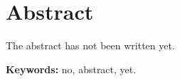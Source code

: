\chapter*{Abstract}

The abstract has not been written yet. %

\vspace{1em}

\noindent \textbf{Keywords:} no, abstract, yet.
